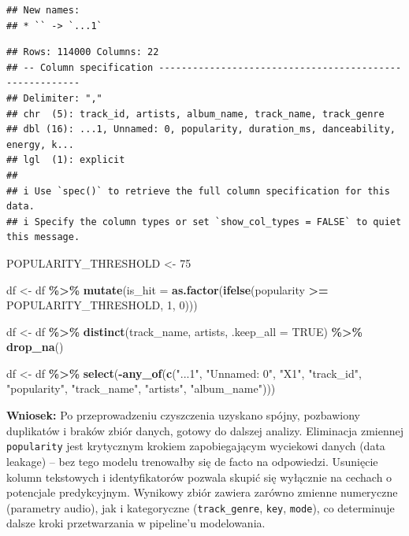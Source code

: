 \documentclass[
]{article}
\newenvironment{Shaded}{\begin{snugshade}}{\end{snugshade}}
\newcommand{\AttributeTok}[1]{\textcolor[rgb]{0.13,0.29,0.53}{#1}}
\newcommand{\ConstantTok}[1]{\textcolor[rgb]{0.56,0.35,0.01}{#1}}
\newcommand{\DecValTok}[1]{\textcolor[rgb]{0.00,0.00,0.81}{#1}}
\newcommand{\FunctionTok}[1]{\textcolor[rgb]{0.13,0.29,0.53}{\textbf{#1}}}
\newcommand{\NormalTok}[1]{#1}
\newcommand{\OtherTok}[1]{\textcolor[rgb]{0.56,0.35,0.01}{#1}}
\newcommand{\SpecialCharTok}[1]{\textcolor[rgb]{0.81,0.36,0.00}{\textbf{#1}}}
\newcommand{\StringTok}[1]{\textcolor[rgb]{0.31,0.60,0.02}{#1}}
\begin{document}
\begin{verbatim}
## New names:
## * `` -> `...1`
\end{verbatim}

\begin{verbatim}
## Rows: 114000 Columns: 22
## -- Column specification --------------------------------------------------------
## Delimiter: ","
## chr  (5): track_id, artists, album_name, track_name, track_genre
## dbl (16): ...1, Unnamed: 0, popularity, duration_ms, danceability, energy, k...
## lgl  (1): explicit
## 
## i Use `spec()` to retrieve the full column specification for this data.
## i Specify the column types or set `show_col_types = FALSE` to quiet this message.
\end{verbatim}

\begin{Shaded}
\begin{Highlighting}[]
\NormalTok{POPULARITY\_THRESHOLD }\OtherTok{\textless{}{-}} \DecValTok{75}

\NormalTok{df }\OtherTok{\textless{}{-}}\NormalTok{ df }\SpecialCharTok{\%\textgreater{}\%}
  \FunctionTok{mutate}\NormalTok{(}\AttributeTok{is\_hit =} \FunctionTok{as.factor}\NormalTok{(}\FunctionTok{ifelse}\NormalTok{(popularity }\SpecialCharTok{\textgreater{}=}\NormalTok{ POPULARITY\_THRESHOLD, }\DecValTok{1}\NormalTok{, }\DecValTok{0}\NormalTok{)))}

\NormalTok{df }\OtherTok{\textless{}{-}}\NormalTok{ df }\SpecialCharTok{\%\textgreater{}\%}
  \FunctionTok{distinct}\NormalTok{(track\_name, artists, }\AttributeTok{.keep\_all =} \ConstantTok{TRUE}\NormalTok{) }\SpecialCharTok{\%\textgreater{}\%}
  \FunctionTok{drop\_na}\NormalTok{()}

\NormalTok{df }\OtherTok{\textless{}{-}}\NormalTok{ df }\SpecialCharTok{\%\textgreater{}\%}
  \FunctionTok{select}\NormalTok{(}\SpecialCharTok{{-}}\FunctionTok{any\_of}\NormalTok{(}\FunctionTok{c}\NormalTok{(}\StringTok{"...1"}\NormalTok{, }\StringTok{"Unnamed: 0"}\NormalTok{, }\StringTok{"X1"}\NormalTok{, }\StringTok{"track\_id"}\NormalTok{, }\StringTok{"popularity"}\NormalTok{, }\StringTok{"track\_name"}\NormalTok{, }\StringTok{"artists"}\NormalTok{, }\StringTok{"album\_name"}\NormalTok{)))}
\end{Highlighting}
\end{Shaded}

\textbf{Wniosek:} Po przeprowadzeniu czyszczenia uzyskano spójny,
pozbawiony duplikatów i braków zbiór danych, gotowy do dalszej analizy.
Eliminacja zmiennej \texttt{popularity} jest krytycznym krokiem
zapobiegającym wyciekowi danych (data leakage) -- bez tego modelu
trenowałby się de facto na odpowiedzi. Usunięcie kolumn tekstowych i
identyfikatorów pozwala skupić się wyłącznie na cechach o potencjale
predykcyjnym. Wynikowy zbiór zawiera zarówno zmienne numeryczne
(parametry audio), jak i kategoryczne (\texttt{track\_genre},
\texttt{key}, \texttt{mode}), co determinuje dalsze kroki przetwarzania
w pipeline'u modelowania.
\end{document}
